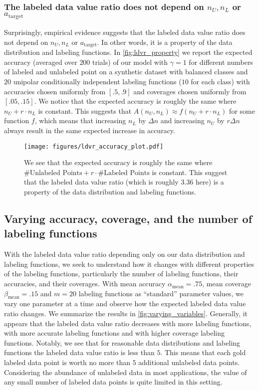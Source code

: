 \subsubsection{The labeled data value ratio does not depend on $n_U,n_L$ or $a_\text{target}$}

Surprisingly, empirical evidence suggests that the labeled data value ratio does not depend on $n_U,n_L$ or $a_\text{target}$. In other words, it is a property of the data distribution and labeling functions. In \autoref{fig:ldvr_property} we report the expected accuracy (averaged over $200$ trials) of our model with $\gamma=1$ for different numbers of labeled and unlabeled point on a synthetic dataset with balanced classes and $20$ unipolar conditionally independent labeling functions ($10$ for each class) with accuracies chosen uniformly from $[.5,.9]$ and coverages chosen uniformly from $[.05,.15]$. We notice that the expected accuracy is roughly the same where $n_U+r\cdot n_L$ is constant. This suggests that $A(n_U,n_L)\approx f(n_U+r\cdot n_L)$ for some function $f$, which means that increasing $n_L$ by $\Delta n$ and increasing $n_U$ by $r\Delta n$ always result in the same expected increase in accuracy.

\begin{figure}
    \centering
    \texttt{[image: figures/ldvr\_accuracy\_plot.pdf]}
    \caption{We see that the expected accuracy is roughly the same where $\#\text{Unlabeled Points}+r\cdot\#\text{Labeled Points}$ is constant. This suggest that the labeled data value ratio (which is roughly $3.36$ here) is a property of the data distribution and labeling functions.}
    \label{fig:ldvr_property}
\end{figure}

\subsection{Varying accuracy, coverage, and the number of labeling functions}
\label{sec:ldvr_varying}

With the labeled data value ratio depending only on our data distribution and labeling functions, we seek to understand how it changes with different properties of the labeling functions, particularly the number of labeling functions, their accuracies, and their coverages. With mean accuracy $\alpha_\text{mean}=.75$, mean coverage $\beta_\text{mean}=.15$ and $m=20$ labeling functions as ``standard'' parameter values, we vary one parameter at a time and observe how the expected labeled data value ratio changes. We summarize the results in \autoref{fig:varying_variables}. Generally, it appears that the labeled data value ratio decreases with more labeling functions, with more accurate labeling functions and with higher coverage labeling functions. Notably, we see that for reasonable data distributions and labeling functions the labeled data value ratio is less than $5$. This means that each gold labeled data point is worth no more than $5$ additional unlabeled data points. Considering the abundance of unlabeled data in most applications, the value of any small number of labeled data points is quite limited in this setting.

